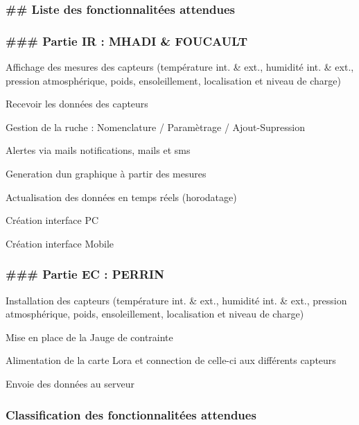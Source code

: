 \subsubsection*{\#\# Liste des fonctionnalitées attendues }

\subsubsection*{\#\#\# Partie IR \+: M\+H\+A\+DI \& F\+O\+U\+C\+A\+U\+LT }


\begin{DoxyItemize}
\item Affichage des mesures des capteurs (température int. \& ext., humidité int. \& ext., pression atmosphérique, poids, ensoleillement, localisation et niveau de charge)
\item Recevoir les données des capteurs
\item Gestion de la ruche \+: Nomenclature / Paramètrage / Ajout-\/\+Supression
\item Alertes via mails notifications, mails et sms
\item Generation d\textquotesingle{}un graphique à partir des mesures
\item Actualisation des données en temps réels (horodatage)
\item Création interface PC
\item Création interface Mobile 

 \subsubsection*{\#\#\# Partie EC \+: P\+E\+R\+R\+IN }
\end{DoxyItemize}


\begin{DoxyItemize}
\item Installation des capteurs (température int. \& ext., humidité int. \& ext., pression atmosphérique, poids, ensoleillement, localisation et niveau de charge)
\item Mise en place de la Jauge de contrainte
\item Alimentation de la carte Lora et connection de celle-\/ci aux différents capteurs
\item Envoie des données au serveur 

 


\end{DoxyItemize}

\subsubsection*{Classification des fonctionnalitées attendues}

